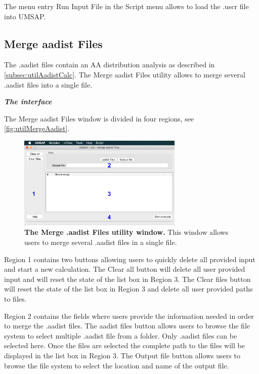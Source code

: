 The menu entry Run Input File in the Script menu allows to load the .uscr file into UMSAP.

\subsection{Merge aadist Files}
\label{subsec:utilMergeAadistFiles}

The .aadist files contain an AA distribution analysis as described in \autoref{subsec:utilAadistCalc}. The Merge aadist Files utility allows to merge several .aadist files into a single file.

\textit{\textbf{The interface}}

The Merge aadist Files window is divided in four regions, see \autoref{fig:utilMergeAadist}.

\begin{figure}[h]
	\centering
	\includegraphics[width=0.7\textwidth]{./IMAGES/UTIL-Maadist-WINDOW/util-maadist.jpg}	    
	\caption[The Merge .aadist Files utility window]{\textbf{The Merge .aadist Files utility window.} This window allows users to merge several .aadist files in a single file.}
	\label{fig:utilMergeAadist}
	\vspace{-5pt} 	
\end{figure}

Region \num{1} contains two buttons allowing users to quickly delete all provided input and start a new calculation. The Clear all button will delete all user provided input and will reset the state of the list box in Region \num{3}. The Clear files button will reset the state of the list box in Region \num{3} and delete all user provided paths to files.

Region \num{2} contains the fields where users provide the information needed in order to merge the .aadist files. The aadist files button allows users to browse the file system to select multiple .aadist file from a folder. Only .aadist files can be selected here. Once the files are selected the complete path to the files will be displayed in the list box in Region \num{3}. The Output file button allows users to browse the file system to select the location and name of the output file.

